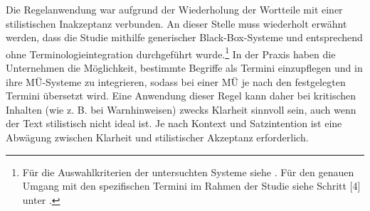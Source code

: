 \begin{figure}


















\captionsetup{width=.45\textwidth}
\begin{floatrow}
\end{floatrow}
\end{figure}

Die Regelanwendung war aufgrund der Wiederholung der Wortteile mit einer stilistischen Inakzeptanz verbunden. An dieser Stelle muss wiederholt erwähnt werden, dass die Studie mithilfe generischer Black-Box{}-Systeme und entsprechend ohne Terminologieintegration durchgeführt wurde.\footnote{\textrm{Für die Auswahlkriterien der untersuchten Systeme siehe . Für den genauen Umgang mit den spezifischen Termini im Rahmen der Studie siehe Schritt [4] unter .}} In der Praxis haben die Unternehmen die Möglichkeit, bestimmte Begriffe als Termini einzupflegen und in ihre MÜ-Systeme zu integrieren, sodass bei einer MÜ je nach den festgelegten Termini übersetzt wird. Eine Anwendung dieser Regel kann daher bei kritischen Inhalten (wie z. B. bei Warnhinweisen) zwecks Klarheit sinnvoll sein, auch wenn der Text stilistisch nicht ideal ist. Je nach Kontext und Satzintention ist eine Abwägung zwischen Klarheit und stilistischer Akzeptanz erforderlich.


